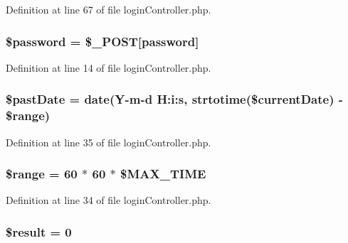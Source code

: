 Definition at line 67 of file login\+Controller.\+php.

\subsubsection[{\texorpdfstring{\$password}{$password}}]{\setlength{\rightskip}{0pt plus 5cm}\$password = \$\+\_\+\+P\+O\+ST\mbox{[}\textquotesingle{}password\textquotesingle{}\mbox{]}}\hypertarget{login_controller_8php_a607686ef9f99ea7c42f4f3dd3dbb2b0d}{}\label{login_controller_8php_a607686ef9f99ea7c42f4f3dd3dbb2b0d}


Definition at line 14 of file login\+Controller.\+php.

\subsubsection[{\texorpdfstring{\$past\+Date}{$pastDate}}]{\setlength{\rightskip}{0pt plus 5cm}\$past\+Date = date(\textquotesingle{}Y-\/m-\/d H\+:i\+:s\textquotesingle{}, strtotime(\$current\+Date) -\/ \$range)}\hypertarget{login_controller_8php_a14cff6ab1fd58b8e2d49e54bbcd093d0}{}\label{login_controller_8php_a14cff6ab1fd58b8e2d49e54bbcd093d0}


Definition at line 35 of file login\+Controller.\+php.

\subsubsection[{\texorpdfstring{\$range}{$range}}]{\setlength{\rightskip}{0pt plus 5cm}\$range = 60 $\ast$ 60 $\ast$ \$M\+A\+X\+\_\+\+T\+I\+ME}\hypertarget{login_controller_8php_ac2e4b5fa63099d7c943a803ae122dd2b}{}\label{login_controller_8php_ac2e4b5fa63099d7c943a803ae122dd2b}


Definition at line 34 of file login\+Controller.\+php.

\subsubsection[{\texorpdfstring{\$result}{$result}}]{\setlength{\rightskip}{0pt plus 5cm}\$result = 0}\hypertarget{login_controller_8php_a112ef069ddc0454086e3d1e6d8d55d07}{}\label{login_controller_8php_a112ef069ddc0454086e3d1e6d8d55d07}


